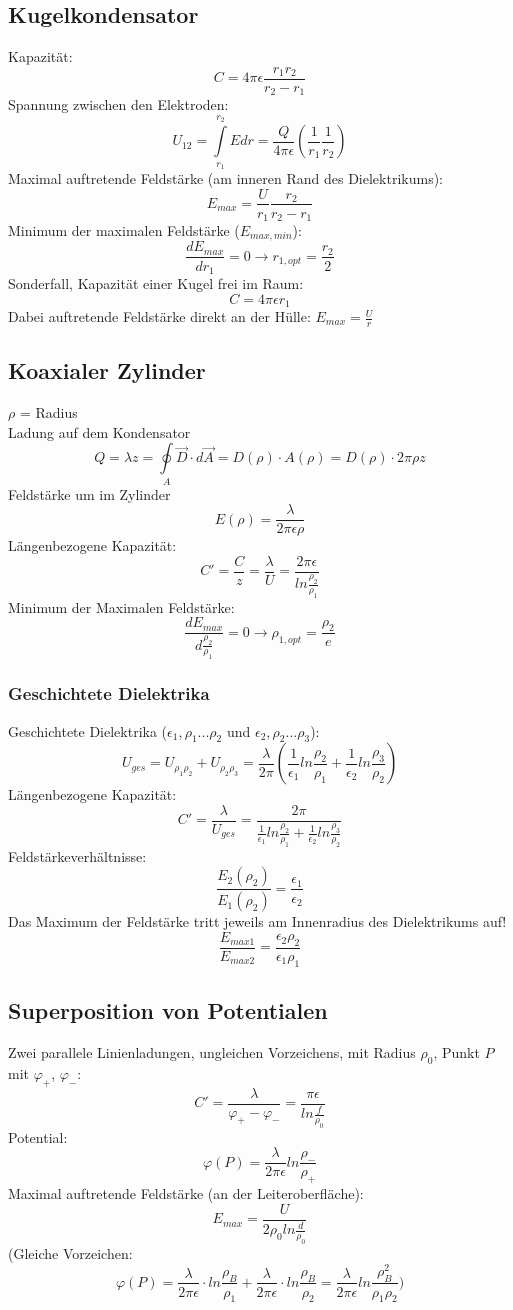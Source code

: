 \documentclass[12pt,a4paper]{article}
\begin{document}
\subsection{Kugelkondensator}
Kapazität:
\[C = 4\pi\epsilon \frac{r_1r_2}{r_2-r_1}\]
Spannung zwischen den Elektroden:
\[U_{12} = \int\limits_{r_1}^{r_2}{Edr} = \frac{Q}{4\pi\epsilon}(\frac{1}{r_1}\frac{1}{r_2})\]
Maximal auftretende Feldstärke (am inneren Rand des Dielektrikums):
\[E_{max} = \frac{U}{r_1}\frac{r_2}{r_2-r_1}\]
Minimum der maximalen Feldstärke ($E_{max, min}$):
\[\frac{dE_{max}}{dr_1} = 0 \rightarrow r_{1,opt} = \frac{r_2}{2}\]
Sonderfall,  Kapazität einer Kugel frei im Raum: 
\[C = 4\pi\epsilon r_1\]
Dabei auftretende Feldstärke direkt an der Hülle:
$E_{max} = \frac{U}{r}$

\subsection{Koaxialer Zylinder}
$\rho$ = Radius\\
Ladung auf dem Kondensator
\[Q = \lambda z = \oint\limits_A{\vec{D}\cdot d\vec{A}} = D(\rho) \cdot A(\rho) = D(\rho) \cdot 2\pi\rho z\]
Feldstärke um im Zylinder
\[E(\rho) = \frac{\lambda}{2\pi\epsilon\rho}\]
Längenbezogene Kapazität:
\[C' = \frac{C}{z} = \frac{\lambda}{U} = \frac{2\pi\epsilon}{ln\frac{\rho_2}{\rho_1}}\]
Minimum der Maximalen Feldstärke:
\[\frac{dE_{max}}{d\frac{\rho_2}{\rho_1}} = 0 \rightarrow \rho_{1,opt} = \frac{\rho_2}{e}\]

\subsubsection{Geschichtete Dielektrika}
Geschichtete Dielektrika ($\epsilon_1, \rho_1 ...\rho_2$ und $\epsilon_2, \rho_2 ... \rho_3$):
\[U_{ges} = U_{\rho_1\rho_2} + U_{\rho_2\rho_3} = \frac{\lambda}{2\pi}(\frac{1}{\epsilon_1}ln\frac{\rho_2}{\rho_1}+\frac{1}{\epsilon_2}ln\frac{\rho_3}{\rho_2})\]
Längenbezogene Kapazität:
\[C' = \frac{\lambda}{U_{ges}} = \frac{2\pi}{\frac{1}{\epsilon_1}ln\frac{\rho_2}{\rho_1}+\frac{1}{\epsilon_2}ln\frac{\rho_3}{\rho_2}}\]
Feldstärkeverhältnisse:
\[\frac{E_2(\rho_2)}{E_1(\rho_2)} = \frac{\epsilon_1}{\epsilon_2}\]
Das Maximum der Feldstärke tritt jeweils am Innenradius des Dielektrikums auf!
\[\frac{E_{max1}}{E_{max2}}=\frac{\epsilon_2 \rho_2}{\epsilon_1 \rho_1}\]

\subsection{Superposition von Potentialen}
Zwei parallele Linienladungen, ungleichen Vorzeichens, mit Radius $\rho_0$, Punkt $P$ mit $\varphi_+$, $\varphi_-$:
\[C' = \frac{\lambda}{\varphi_+ - \varphi_-} = \frac{\pi\epsilon}{ln\frac{f}{\rho_0}}\]
Potential:
\[\varphi(P) = \frac{\lambda}{2\pi\epsilon}ln\frac{\rho_-}{\rho_+}\]
Maximal auftretende Feldstärke (an der Leiteroberfläche):
\[E_{max} = \frac{U}{2\rho_0 ln\frac{d}{\rho_0}}\]
(Gleiche Vorzeichen:
\[\varphi(P) = \frac{\lambda}{2\pi \epsilon}\cdot ln\frac{\rho_B}{\rho_1} + \frac{\lambda}{2\pi\epsilon}\cdot ln\frac{\rho_B}{\rho_2} =  \frac{\lambda}{2\pi\epsilon}ln\frac{\rho_B^2}{\rho_1\rho_2})\]
\end{document}
